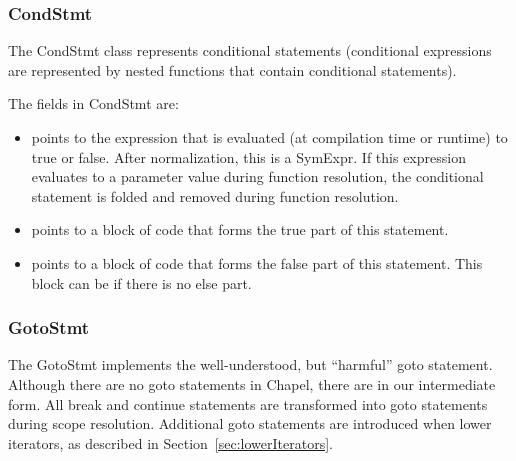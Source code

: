 \documentclass[10pt]{article}
\begin{document}
\subsubsection{CondStmt}
\label{sec:condstmt}

The CondStmt class represents conditional statements (conditional
expressions are represented by nested functions that contain
conditional statements).

The fields in CondStmt are:
\begin{itemize}
\item {} points to the expression that is evaluated
  (at compilation time or runtime) to true or false.  After
  normalization, this is a SymExpr.  If this expression evaluates to a
  parameter value during function resolution, the conditional
  statement is folded and removed during function resolution.
\item {} points to a block of code that forms
  the true part of this statement.
\item {} points to a block of code that forms
  the false part of this statement.  This block can be  if
  there is no else part.
\end{itemize}

\subsubsection{GotoStmt}
\label{sec:gotostmt}

The GotoStmt implements the well-understood, but ``harmful'' goto
statement.  Although there are no goto statements in Chapel, there are
in our intermediate form.  All break and continue statements are
transformed into goto statements during scope resolution.  Additional
goto statements are introduced when lower iterators, as described in
Section~\ref{sec:lowerIterators}.
\end{document}
